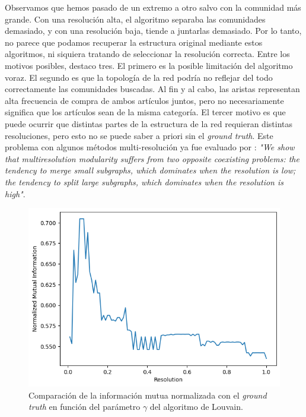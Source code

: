 Observamos que hemos pasado de un extremo a otro salvo con la comunidad más
grande. Con una resolución alta, el algoritmo separaba las comunidades
demasiado, y con una resolución baja, tiende a juntarlas demasiado. Por lo
tanto, no parece que podamos recuperar la estructura original mediante estos
algoritmos, ni siquiera tratando de seleccionar la resolución correcta. Entre
los motivos posibles, destaco tres. El primero es la posible limitación del
algoritmo voraz. El segundo es que la topología de la red podría no reflejar del todo
correctamente las comunidades buscadas. Al fin y al cabo, las aristas representan
alta frecuencia de compra de ambos artículos juntos, pero no necesariamente
significa que los artículos sean de la misma categoría. El tercer motivo es que
puede ocurrir que distintas partes de la estructura de la red requieran distintas
resoluciones, pero esto no se puede saber a priori sin el \emph{ground truth}.
Este problema con algunos métodos multi-resolución ya fue evaluado por
\citeauthor{lancichinetti2011Limitsmodularity}
\cite{lancichinetti2011Limitsmodularity}: \emph{"We show that multiresolution
modularity suffers from two opposite coexisting problems: the tendency to merge
small subgraphs, which dominates when the resolution is low; the tendency to
split large subgraphs, which dominates when the resolution is high"}.

\begin{figure}[!htb]
  \centering
  \includegraphics[width=.7\linewidth]{img/1_resolution_vs_nmi}
  \caption{Comparación de la información mutua normalizada con el \emph{ground}
    \emph{truth} en función del parámetro $\gamma$ del algoritmo de Louvain.}
  \label{fig:1-resolution-vs-nmi}
\end{figure}

